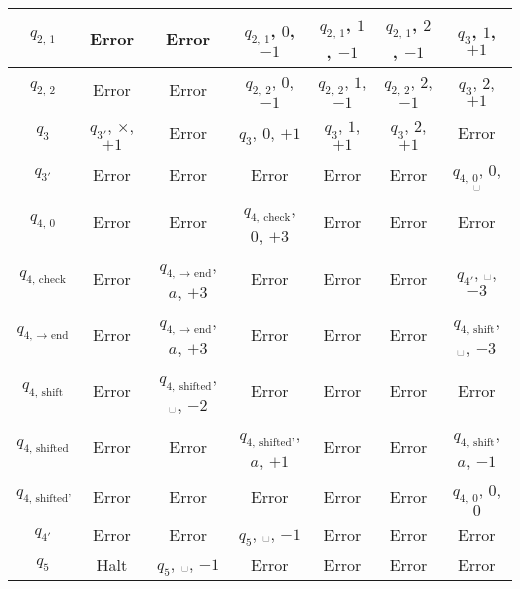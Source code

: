 \documentclass[12pt,a4paper]{article}
\newcommand{\spacesymbol}{\ensuremath{\text{\textvisiblespace}}}
\begin{document}
\begin{enumproblem}
\begin{table}[H]
\begin{tabular}{c||c|c|c|c|c|c}
                $q_{\text{2, 1}}$& Error& Error& $q_{\text{2, 1}}$, $0$, $-1$& $q_{\text{2, 1}}$, $1$, $-1$& $q_{\text{2, 1}}$, $2$, $-1$& $q_3$, $1$, $+1$\\
                \hline
                $q_{\text{2, 2}}$& Error& Error& $q_{\text{2, 2}}$, $0$, $-1$& $q_{\text{2, 2}}$, $1$, $-1$& $q_{\text{2, 2}}$, $2$, $-1$& $q_3$, $2$, $+1$\\
                \hline
                $q_3$& $q_{3'}$, $\times$, $+1$& Error& $q_3$, $0$, $+1$& $q_3$, $1$, $+1$& $q_3$, $2$, $+1$& Error\\
                \hline
                $q_{3'}$& Error& Error& Error& Error& Error& $q_{\text{4, 0}}$, $0$, \spacesymbol\\
                \hline
                $q_{\text{4, 0}}$& Error& Error& $q_{\text{4, check}}$, $0$, $+3$& Error& Error& Error\\
                \hline
                $q_{\text{4, check}}$& Error& $q_{\text{4, $\to$ end}}$, $a$, $+3$& Error& Error& Error& $q_{4'}$, \spacesymbol, $-3$\\
                \hline
                $q_{\text{4, $\to$ end}}$& Error& $q_{\text{4, $\to$ end}}$, $a$, $+3$& Error& Error& Error& $q_{\text{4, shift}}$, \spacesymbol, $-3$\\
                \hline
                $q_{\text{4, shift}}$& Error& $q_{\text{4, shifted}}$, \spacesymbol, $-2$& Error& Error& Error& Error\\
                \hline
                $q_{\text{4, shifted}}$& Error& Error& $q_{\text{4, shifted'}}$, $a$, $+1$& Error& Error& $q_{\text{4, shift}}$, $a$, $-1$\\
                \hline
                $q_{\text{4, shifted'}}$& Error& Error& Error& Error& Error& $q_{\text{4, 0}}$, $0$, $0$\\
                \hline
                $q_{4'}$& Error& Error& $q_5$, \spacesymbol, $-1$& Error& Error& Error\\
                \hline
                $q_5$& Halt& $q_5$, \spacesymbol, $-1$& Error& Error& Error& Error\\
            \end{tabular}
        \end{table}


\end{enumproblem}
\end{document}
